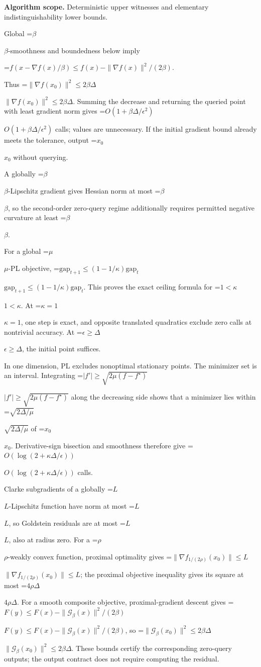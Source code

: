 \documentclass[10pt,a4paper]{article}
\newcommand{\AtlasMath}[1]{\par\begingroup\centering\setbox0=\hbox{$\displaystyle #1$}\ifdim\wd0>1.4\linewidth\typeout{ATLAS WIDE FORMULA: \the\wd0}\fi\ifdim\wd0>\linewidth\resizebox{\linewidth}{!}{\box0}\else\box0\fi\par\endgroup}
\newcommand{\AtlasInlineMath}[1]{\begingroup\setbox0=\hbox{$#1$}\ifdim\wd0>.4\linewidth\endgroup\AtlasMath{#1}\else\endgroup$#1$\fi}
\begin{document}
\textbf{Algorithm scope.} Deterministic upper witnesses and elementary indistinguishability lower bounds.

Global \AtlasInlineMath{\beta}-smoothness and boundedness below imply



\AtlasMath{f(x-\nabla f(x)/\beta)\le f(x)-\|\nabla f(x)\|^2/(2\beta).}



Thus \AtlasInlineMath{\|\nabla f(x_0)\|^2\le2\beta\Delta}. Summing the decrease and returning the queried point with least gradient norm gives \AtlasInlineMath{O(1+\beta\Delta/\epsilon^2)} calls; values are unnecessary. If the initial gradient bound already meets the tolerance, output \AtlasInlineMath{x_0} without querying.

A globally \AtlasInlineMath{\beta}-Lipschitz gradient gives Hessian norm at most \AtlasInlineMath{\beta}, so the second-order zero-query regime additionally requires permitted negative curvature at least \AtlasInlineMath{\beta}.

For a global \AtlasInlineMath{\mu}-PL objective,
\AtlasInlineMath{\mathrm{gap}_{t+1}\le(1-1/\kappa)\mathrm{gap}_t}.
This proves the exact ceiling formula for \AtlasInlineMath{1<\kappa}. At \AtlasInlineMath{\kappa=1}, one step is exact, and opposite translated quadratics exclude zero calls at nontrivial accuracy. At \AtlasInlineMath{\epsilon\ge\Delta}, the initial point suffices.

In one dimension, PL excludes nonoptimal stationary points. The minimizer set is an interval. Integrating
\AtlasInlineMath{|f'|\ge\sqrt{2\mu(f-f^\star)}}
along the decreasing side shows that a minimizer lies within \AtlasInlineMath{\sqrt{2\Delta/\mu}} of \AtlasInlineMath{x_0}. Derivative-sign bisection and smoothness therefore give \AtlasInlineMath{O(\log(2+\kappa\Delta/\epsilon))} calls.

Clarke subgradients of a globally \AtlasInlineMath{L}-Lipschitz function have norm at most \AtlasInlineMath{L}, so Goldstein residuals are at most \AtlasInlineMath{L}, also at radius zero. For a \AtlasInlineMath{\rho}-weakly convex function, proximal optimality gives
\AtlasInlineMath{\|\nabla f_{1/(2\rho)}(x_0)\|\le L}; the proximal objective inequality gives its square at most \AtlasInlineMath{4\rho\Delta}.
For a smooth composite objective, proximal-gradient descent gives
\AtlasInlineMath{F(y)\le F(x)-\|\mathcal G_\beta(x)\|^2/(2\beta)},
so \AtlasInlineMath{\|\mathcal G_\beta(x_0)\|^2\le2\beta\Delta}.
These bounds certify the corresponding zero-query outputs; the output contract does not require computing the residual.
\end{document}
